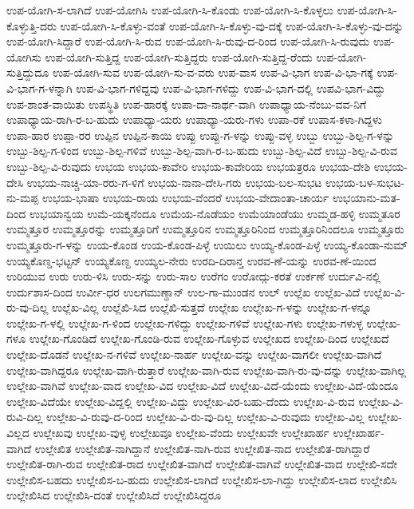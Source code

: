 ಉಪ-ಯೋಗಿ-ಸ-ಲಾಗಿದೆ
ಉಪ-ಯೋಗಿಸಿ
ಉಪ-ಯೋಗಿ-ಸಿ-ಕೊಂಡು
ಉಪ-ಯೋಗಿ-ಸಿ-ಕೊಳ್ಳಲು
ಉಪ-ಯೋಗಿ-ಸಿ-ಕೊಳ್ಳುತ್ತಿ-ದರು
ಉಪ-ಯೋಗಿ-ಸಿ-ಕೊಳ್ಳು-ವಂತೆ
ಉಪ-ಯೋಗಿ-ಸಿ-ಕೊಳ್ಳು-ವು-ದಕ್ಕೆ
ಉಪ-ಯೋಗಿ-ಸಿ-ಕೊಳ್ಳು-ವು-ದನ್ನು
ಉಪ-ಯೋಗಿ-ಸಿದ್ದಾರೆ
ಉಪ-ಯೋಗಿ-ಸಿ-ರುವ
ಉಪ-ಯೋಗಿ-ಸಿ-ರುವು-ದ-ರಿಂದ
ಉಪ-ಯೋಗಿ-ಸಿ-ರುವುದು
ಉಪ-ಯೋಗಿಸು
ಉಪ-ಯೋಗಿ-ಸುತ್ತಿದ್ದ
ಉಪ-ಯೋಗಿ-ಸುತ್ತಿದ್ದರು
ಉಪ-ಯೋಗಿ-ಸುತ್ತಿದ್ದ-ರೆಂದು
ಉಪ-ಯೋಗಿ-ಸುತ್ತಿದ್ದುದೂ
ಉಪ-ಯೋಗಿ-ಸುವ
ಉಪ-ಯೋಗಿ-ಸು-ವ-ವರು
ಉಪ-ವಾಸ
ಉಪ-ವಿ-ಭಾಗ
ಉಪ-ವಿ-ಭಾ-ಗಕ್ಕೆ
ಉಪ-ವಿ-ಭಾಗ-ಗ-ಳನ್ನಾಗಿ
ಉಪ-ವಿ-ಭಾಗ-ಗಳಿದ್ದವು
ಉಪ-ವಿ-ಭಾಗ-ಗಳಿದ್ದು
ಉಪ-ವಿ-ಭಾಗ-ದಲ್ಲಿ
ಉಪವಿ-ಭಾಗ-ವಿದ್ದು
ಉಪ-ಶಾಂತ-ವಾಯಿತು
ಉಪಸ್ಥಿತಿ
ಉಪ-ಹಾರಕ್ಕೆ
ಉಪಾ-ದಾ-ನಾರ್ಥ-ವಾಗಿ
ಉಪಾಧ್ಯಾಯ-ನೆಂಬು-ವವ-ನಿಗೆ
ಉಪಾಧ್ಯಾಯ-ರಾಗಿ-ರ-ಬ-ಹುದು
ಉಪಾಧ್ಯಾ-ಯರು
ಉಪಾಧ್ಯಾ-ಯರು-ಗಳು
ಉಪಾ-ರಕೆ
ಉಪಾಸ-ಕಳಾ-ಗಿದ್ದಳು
ಉಪಾ-ಹಾರ
ಉಪ್ಪಾ-ರರ
ಉಪ್ಪಿನ
ಉಪ್ಪಿನ-ಕಾಯಿ
ಉಪ್ಪು
ಉಪ್ಪು-ಗ-ಳನ್ನು
ಉಪ್ಪು-ವಳ್ಳ
ಉಬ್ಬು
ಉಬ್ಬು-ಶಿಲ್ಪ-ಗ-ಳನ್ನು
ಉಬ್ಬು-ಶಿಲ್ಪ-ಗ-ಳಿಂದ
ಉಬ್ಬು-ಶಿಲ್ಪ-ಗಳಿವೆ
ಉಬ್ಬು-ಶಿಲ್ಪ-ವಾಗಿ-ರ-ಬ-ಹುದು
ಉಬ್ಬು-ಶಿಲ್ಪ-ವಿದೆ
ಉಬ್ಬು-ಶಿಲ್ಪ-ವಿ-ರುವ
ಉಬ್ಬು-ಶಿಲ್ಪ-ವಿ-ರುವುದು
ಉಭಯ
ಉಭಯ-ಕಾವೇರಿ
ಉಭಯ-ಕಾವೇರಿಯ
ಉಭಯತ್ರರೂ
ಉಭಯ-ದೇಶಿ
ಉಭಯ-ದೇಸಿ
ಉಭಯ-ನಾಚ್ಚಿ-ಯಾ-ರರು-ಗ-ಳಿಗೆ
ಉಭಯ-ನಾನಾ-ದೇಸಿ-ಗರು
ಉಭಯ-ಬಲ-ಸುಭಟ
ಉಭಯ-ಬಳ-ಸುಭಟ-ನು-ಮಪ್ಪ
ಉಭಯ-ಭಾಷಾ
ಉಭಯ-ರಾಯ
ಉಭಯ-ವೆಂದರೆ
ಉಭಯ-ವೇದಾಂತಾ-ಚಾರ್ಯ
ಉಭಯಾನು-ಮತ-ದಿಂದ
ಉಭಯಾನ್ವಯ
ಉಮೆ-ಯಕ್ಕನೆಂದೂ
ಉಮೆಯ-ನೊಡೆಯಂ
ಉಮೆಯಾಂಡೆಯು
ಉಮ್ಮಡ-ಹಳ್ಳಿ
ಉಮ್ಮತೂರ
ಉಮ್ಮತ್ತೂರ
ಉಮ್ಮತ್ತೂರನ್ನು
ಉಮ್ಮತ್ತೂರಿಗೆ
ಉಮ್ಮತ್ತೂರಿನ
ಉಮ್ಮತ್ತೂರಿನಿಂದ
ಉಮ್ಮತ್ತೂರಿನಿಂದಲೂ
ಉಮ್ಮತ್ತೂರು
ಉಮ್ಮತ್ತೂರು-ಗ-ಳನ್ನು
ಉಯ-ಕೊಂಡ
ಉಯ-ಕೊಂಡ-ಪಿಳ್ಳೆ
ಉಯಿಲು
ಉಯ್ಯ-ಕೊಂಡ-ಪಿಳ್ಳೆ
ಉಯ್ಯ-ಕೊಂಡಾ-ನುಮ್
ಉಯ್ಯಕೊಣ್ಡ-ಭಟ್ಟನ್
ಉಯ್ಯಕೊಣ್ದ
ಉಯ್ಯಲ-ನೇರು
ಉರದಿ-ದಿರಾನ್ತ
ಉರವ-ಣೆ-ಯನ್ನು
ಉರವ-ಣೆ-ಯಿಂದ
ಉರಿಯುವ
ಉರು
ಉರು-ಳಿಸಿ
ಉರು-ಸನ್ನು
ಉರು-ಸಾಲ
ಉರೆಗಂ
ಉರೋದ್ಗು-ಕರತೆ
ಉರ್ಕಣೆ
ಉರ್ದುವಿ-ನಲ್ಲಿ
ಉರ್ದುಶಾಸ-ದಿಂದ
ಉರ್ವೀ-ಧರ
ಉಲಗಮುಣ್ಢಾನ್
ಉಲ-ಗಾ-ಮುಂಡನ
ಉಲ್
ಉಲ್ಲೆಖ
ಉಲ್ಲೆಖ-ವಿದೆ
ಉಲ್ಲೆಖ-ವಿ-ರು-ವು-ದಿಲ್ಲ
ಉಲ್ಲೆಖ-ವಿಲ್ಲ
ಉಲ್ಲೆಖಿ-ಸಿದ
ಉಲ್ಲೆಖಿ-ಸುತ್ತದೆ
ಉಲ್ಲೇಖ
ಉಲ್ಲೇಖ-ಗ-ಳನ್ನು
ಉಲ್ಲೇಖ-ಗ-ಳನ್ನೂ
ಉಲ್ಲೇಖ-ಗ-ಳಲ್ಲಿ
ಉಲ್ಲೇಖ-ಗ-ಳಿಂದ
ಉಲ್ಲೇಖ-ಗಳಿದ್ದು
ಉಲ್ಲೇಖ-ಗಳಿವೆ
ಉಲ್ಲೇಖ-ಗಳು
ಉಲ್ಲೇಖ-ಗಳುಳ್ಳ
ಉಲ್ಲೇಖ-ಗಳೂ
ಉಲ್ಲೇಖ-ಗೊಂಡಿದೆ
ಉಲ್ಲೇಖ-ಗೊಂಡಿ-ರುವ
ಉಲ್ಲೇಖ-ಗೊಳ್ಳುವ
ಉಲ್ಲೇಖದ
ಉಲ್ಲೇಖ-ದಿಂದ
ಉಲ್ಲೇಖದೆ
ಉಲ್ಲೇಖ-ದೊಡನೆ
ಉಲ್ಲೇಖ-ನ-ಗಳಿವೆ
ಉಲ್ಲೇಖ-ನಾರ್ಹ
ಉಲ್ಲೇಖ-ವನ್ನು
ಉಲ್ಲೇಖ-ವಾಗಲೀ
ಉಲ್ಲೇಖ-ವಾಗಿದೆ
ಉಲ್ಲೇಖ-ವಾಗಿದ್ದರೂ
ಉಲ್ಲೇಖ-ವಾಗಿ-ರುತ್ತಾರೆ
ಉಲ್ಲೇಖ-ವಾಗಿ-ರುವ
ಉಲ್ಲೇಖ-ವಾಗಿ-ರು-ವು-ದನ್ನು
ಉಲ್ಲೇಖ-ವಾಗಿಲ್ಲ
ಉಲ್ಲೇಖ-ವಾಗಿವೆ
ಉಲ್ಲೇಖ-ವಾದ
ಉಲ್ಲೇಖ-ವಿದ
ಉಲ್ಲೇಖ-ವಿದೆ
ಉಲ್ಲೇಖ-ವಿದೆ-ಯೆಂದು
ಉಲ್ಲೇಖ-ವಿದೆ-ಯೆಂದೂ
ಉಲ್ಲೇಖ-ವಿದೆಯೇ
ಉಲ್ಲೇಖ-ವಿದ್ದಲ್ಲಿ
ಉಲ್ಲೇಖ-ವಿದ್ದು
ಉಲ್ಲೇಖ-ವಿರ-ಬಹು-ದೆಂದು
ಉಲ್ಲೇಖ-ವಿ-ರುವ
ಉಲ್ಲೇಖ-ವಿ-ರುವಿ-ದಿಲ್ಲ
ಉಲ್ಲೇಖ-ವಿ-ರುವು-ದ-ರಿಂದ
ಉಲ್ಲೇಖ-ವಿ-ರು-ವು-ದಿಲ್ಲ
ಉಲ್ಲೇಖ-ವಿ-ರುವುದು
ಉಲ್ಲೇಖ-ವಿಲ್ಲ
ಉಲ್ಲೇಖ-ವಿಲ್ಲದ
ಉಲ್ಲೇಖವು
ಉಲ್ಲೇಖ-ವುಳ್ಳ
ಉಲ್ಲೇಖವೂ
ಉಲ್ಲೇಖ-ವೆಂದು
ಉಲ್ಲೇಖವೇ
ಉಲ್ಲೇಖಾರ್ಹ
ಉಲ್ಲೇಖಾರ್ಹ-ವಾಗಿದೆ
ಉಲ್ಲೇಖಿತ
ಉಲ್ಲೇಖಿತ-ನಾಗಿದ್ದಾನೆ
ಉಲ್ಲೇಖಿತ-ನಾಗಿ-ರುವ
ಉಲ್ಲೇಖಿತ-ನಾದ
ಉಲ್ಲೇಖಿತ-ರಾಗಿದ್ದಾರೆ
ಉಲ್ಲೇಖಿತ-ರಾಗಿ-ರುವ
ಉಲ್ಲೇಖಿತ-ರಾದ
ಉಲ್ಲೇಖಿತ-ವಾಗಿದೆ
ಉಲ್ಲೇಖಿತ-ವಾಗಿವೆ
ಉಲ್ಲೇಖಿತ-ವಾದ
ಉಲ್ಲೇಖಿ-ಸದೇ
ಉಲ್ಲೇಖಿಸ-ಬಹದು
ಉಲ್ಲೇಖಿಸ-ಬ-ಹುದು
ಉಲ್ಲೇಖಿಸ-ಲಾಗಿದೆ
ಉಲ್ಲೇಖಿಸ-ಲಾ-ಗಿದ್ದು
ಉಲ್ಲೇಖಿಸ-ಲಾದ
ಉಲ್ಲೇಖಿಸಿ
ಉಲ್ಲೇಖಿಸಿದ
ಉಲ್ಲೇಖಿಸಿ-ದಂತೆ
ಉಲ್ಲೇಖಿಸಿದೆ
ಉಲ್ಲೇಖಿಸಿದ್ದರೂ

